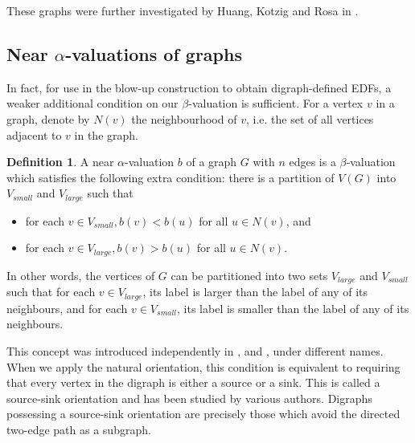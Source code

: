 \documentclass[12pt, a4paper]{article}
\theoremstyle{definition}
\newtheorem{definition}[theorem]{Definition}
\begin{document}
These graphs were further investigated by Huang, Kotzig and Rosa in \cite{HuKoRo}. 


\subsection{Near $\alpha$-valuations of graphs}

In fact, for use in the blow-up construction to obtain digraph-defined EDFs, a weaker additional condition on our $\beta$-valuation is sufficient.  For a vertex $v$ in a graph, denote by $N(v)$ the neighbourhood of $v$, i.e. the set of all vertices adjacent to $v$ in the graph.

\begin{definition}
A near $\alpha$-valuation $b$ of a graph $G$ with $n$ edges is a $\beta$‐valuation which satisfies the following extra condition: there is a partition of $V(G)$ into $V_{small}$ and $V_{large}$ such that
\begin{itemize}
\item for each $v \in V_{small}, b(v) < b(u)$ for all $u \in N(v)$, and 
\item for each $v \in V_{large}, b(v) > b(u)$ for all $u \in N(v)$.
\end{itemize}
In other words, the vertices of $G$ can be partitioned into two sets $V_{large}$ and $V_{small}$ such that for each $v \in V_{large}$, its label is larger than the label of any of its neighbours, and for each $v \in V_{small}$, its label is smaller than the label of any of its neighbours.
\end{definition}

This concept was introduced independently in \cite{Cahit}, \cite{Grannell} and \cite{El-Zanati}, under different names.  When we apply the natural orientation, this condition is equivalent to requiring that every vertex in the digraph is either a source or a sink. This is called a source-sink orientation and has been studied by various authors. Digraphs possessing a source-sink orientation are precisely those which avoid the directed two-edge path as a subgraph.
\end{document}
